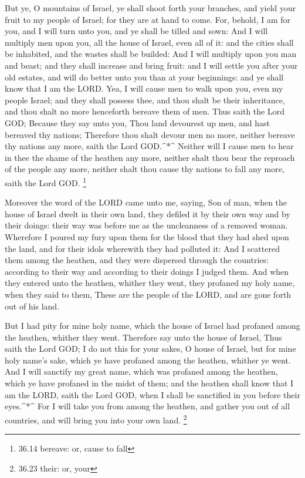  But ye, O mountains of Israel, ye shall shoot forth your
branches, and yield your fruit to my people of Israel; for they are at
hand to come.  For, behold, I am for you, and I will turn
unto you, and ye shall be tilled and sown:  And I will
multiply men upon you, all the house of Israel, even all of it: and the
cities shall be inhabited, and the wastes shall be builded:
 And I will multiply upon you man and beast; and they shall
increase and bring fruit: and I will settle you after your old estates,
and will do better unto you than at your beginnings: and ye shall know
that I am the LORD.  Yea, I will cause men to walk upon
you, even my people Israel; and they shall possess thee, and thou shalt
be their inheritance, and thou shalt no more henceforth bereave them of
men.  Thus saith the Lord GOD; Because they say unto you,
Thou land devourest up men, and hast bereaved thy nations; 
Therefore thou shalt devour men no more, neither bereave thy nations any
more, saith the Lord GOD.\^{}*\^{}  Neither will I cause
men to hear in thee the shame of the heathen any more, neither shalt
thou bear the reproach of the people any more, neither shalt thou cause
thy nations to fall any more, saith the Lord GOD. \footnote{36.14
  bereave: or, cause to fall}

 Moreover the word of the LORD came unto me, saying,
 Son of man, when the house of Israel dwelt in their own
land, they defiled it by their own way and by their doings: their way
was before me as the uncleanness of a removed woman. 
Wherefore I poured my fury upon them for the blood that they had shed
upon the land, and for their idols wherewith they had polluted it:
 And I scattered them among the heathen, and they were
dispersed through the countries: according to their way and according to
their doings I judged them.  And when they entered unto the
heathen, whither they went, they profaned my holy name, when they said
to them, These are the people of the LORD, and are gone forth out of his
land.

 But I had pity for mine holy name, which the house of
Israel had profaned among the heathen, whither they went. 
Therefore say unto the house of Israel, Thus saith the Lord GOD; I do
not this for your sakes, O house of Israel, but for mine holy name's
sake, which ye have profaned among the heathen, whither ye went.
 And I will sanctify my great name, which was profaned
among the heathen, which ye have profaned in the midst of them; and the
heathen shall know that I am the LORD, saith the Lord GOD, when I shall
be sanctified in you before their eyes.\^{}*\^{}  For I
will take you from among the heathen, and gather you out of all
countries, and will bring you into your own land. \footnote{36.23 their:
  or, your}

